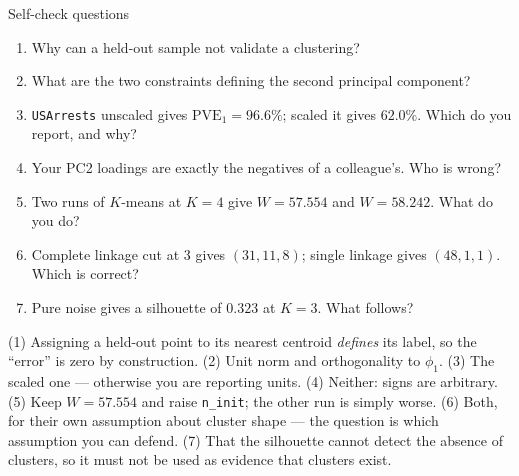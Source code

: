 \documentclass[aspectratio=169,11pt]{beamer}
\begin{document}
\begin{frame}{Self-check questions}
  \scriptsize
  \begin{readme}
    \begin{enumerate}
      \item Why can a held-out sample not validate a clustering?
      \item What are the two constraints defining the second principal component?
      \item \texttt{USArrests} unscaled gives $\mathrm{PVE}_1=96.6\%$; scaled it gives
            $62.0\%$. Which do you report, and why?
      \item Your PC2 loadings are exactly the negatives of a colleague's. Who is wrong?
      \item Two runs of $K$-means at $K=4$ give $W=57.554$ and $W=58.242$. What do you do?
      \item Complete linkage cut at $3$ gives $(31,11,8)$; single linkage gives
            $(48,1,1)$. Which is correct?
      \item Pure noise gives a silhouette of $0.323$ at $K=3$. What follows?
    \end{enumerate}
  \end{readme}
  \begin{takeaway}[{{Answers}}]
    (1) Assigning a held-out point to its nearest centroid \emph{defines} its label, so the
    ``error'' is zero by construction. (2) Unit norm and orthogonality to $\phi_1$.
    (3) The scaled one --- otherwise you are reporting units. (4) Neither: signs are
    arbitrary. (5) Keep $W=57.554$ and raise \texttt{n\_init}; the other run is simply
    worse. (6) Both, for their own assumption about cluster shape --- the question is which
    assumption you can defend. (7) That the silhouette cannot detect the absence of
    clusters, so it must not be used as evidence that clusters exist.
  \end{takeaway}
\end{frame}
\end{document}

